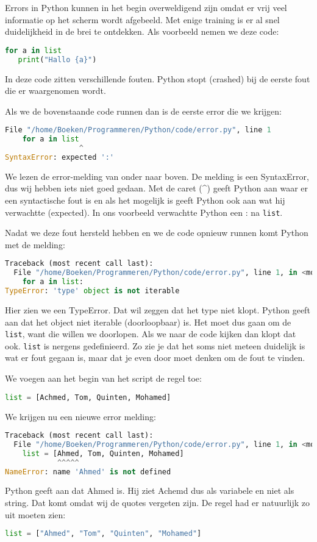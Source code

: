 Errors in Python kunnen in het begin overweldigend zijn omdat er vrij veel informatie op het scherm wordt afgebeeld. Met enige training is er al snel duidelijkheid in de brei te ontdekken. Als voorbeeld nemen we deze code:
\begin{lstlisting}[language=python]
for a in list
   print("Hallo {a}")
\end{lstlisting}
In deze code zitten verschillende fouten. Python stopt (crashed) bij de eerste fout die er waargenomen wordt.

Als we de bovenstaande code runnen dan is de eerste error die we krijgen:
\begin{lstlisting}[language=python]
  File "/home/Boeken/Programmeren/Python/code/error.py", line 1
    for a in list
                 ^
SyntaxError: expected ':'
\end{lstlisting}
We lezen de error-melding van onder naar boven. De melding is een SyntaxError, dus wij hebben iets niet goed gedaan. Met de caret (\textasciicircum) geeft Python aan waar er een syntactische fout is en als het mogelijk is geeft Python ook aan wat hij verwachtte (expected). In ons voorbeeld verwachtte Python een : na \texttt{list}.

Nadat we deze fout hersteld hebben en we de code opnieuw runnen komt Python met de melding:
\begin{lstlisting}[language=python]
Traceback (most recent call last):
  File "/home/Boeken/Programmeren/Python/code/error.py", line 1, in <module>
    for a in list:
TypeError: 'type' object is not iterable
\end{lstlisting}
Hier zien we een TypeError. Dat wil zeggen dat het type niet klopt. Python geeft aan dat het object niet iterable (doorloopbaar) is. Het moet dus gaan om de \texttt{list}, want die willen we doorlopen. Als we naar de code kijken dan klopt dat ook. \texttt{list} is nergens gedefinieerd. Zo zie je dat het soms niet meteen duidelijk is wat er fout gegaan is, maar dat je even door moet denken om de fout te vinden.

We voegen aan het begin van het script de regel toe:
\begin{lstlisting}[language=python]
list = [Achmed, Tom, Quinten, Mohamed]
\end{lstlisting}

We krijgen nu een nieuwe error melding:
\begin{lstlisting}[language=python]
Traceback (most recent call last):
  File "/home/Boeken/Programmeren/Python/code/error.py", line 1, in <module>
    list = [Ahmed, Tom, Quinten, Mohamed]
            ^^^^^
NameError: name 'Ahmed' is not defined
\end{lstlisting}
Python geeft aan dat Ahmed  is. Hij ziet Achemd dus als variabele en niet als string. Dat komt omdat wij de quotes vergeten zijn. De regel had er natuurlijk zo uit moeten zien:
\begin{lstlisting}[language=python]
list = ["Ahmed", "Tom", "Quinten", "Mohamed"]
\end{lstlisting}

